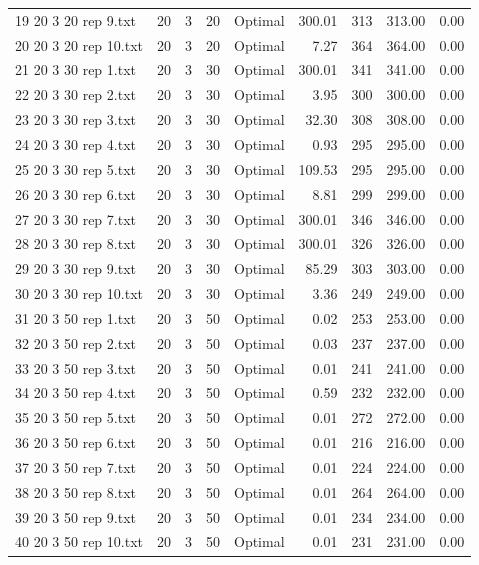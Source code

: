 \begin{longtable}{lrrllrrrr}
19 20 3 20 rep 9.txt & 20 & 3 & 20 & Optimal & 300.01 & 313 & 313.00 &  0.00\\
20 20 3 20 rep 10.txt & 20 & 3 & 20 & Optimal &  7.27 & 364 & 364.00 &  0.00\\
21 20 3 30 rep 1.txt & 20 & 3 & 30 & Optimal & 300.01 & 341 & 341.00 &  0.00\\
22 20 3 30 rep 2.txt & 20 & 3 & 30 & Optimal &  3.95 & 300 & 300.00 &  0.00\\
23 20 3 30 rep 3.txt & 20 & 3 & 30 & Optimal & 32.30 & 308 & 308.00 &  0.00\\
24 20 3 30 rep 4.txt & 20 & 3 & 30 & Optimal &  0.93 & 295 & 295.00 &  0.00\\
25 20 3 30 rep 5.txt & 20 & 3 & 30 & Optimal & 109.53 & 295 & 295.00 &  0.00\\
26 20 3 30 rep 6.txt & 20 & 3 & 30 & Optimal &  8.81 & 299 & 299.00 &  0.00\\
27 20 3 30 rep 7.txt & 20 & 3 & 30 & Optimal & 300.01 & 346 & 346.00 &  0.00\\
28 20 3 30 rep 8.txt & 20 & 3 & 30 & Optimal & 300.01 & 326 & 326.00 &  0.00\\
29 20 3 30 rep 9.txt & 20 & 3 & 30 & Optimal & 85.29 & 303 & 303.00 &  0.00\\
30 20 3 30 rep 10.txt & 20 & 3 & 30 & Optimal &  3.36 & 249 & 249.00 &  0.00\\
31 20 3 50 rep 1.txt & 20 & 3 & 50 & Optimal &  0.02 & 253 & 253.00 &  0.00\\
32 20 3 50 rep 2.txt & 20 & 3 & 50 & Optimal &  0.03 & 237 & 237.00 &  0.00\\
33 20 3 50 rep 3.txt & 20 & 3 & 50 & Optimal &  0.01 & 241 & 241.00 &  0.00\\
34 20 3 50 rep 4.txt & 20 & 3 & 50 & Optimal &  0.59 & 232 & 232.00 &  0.00\\
35 20 3 50 rep 5.txt & 20 & 3 & 50 & Optimal &  0.01 & 272 & 272.00 &  0.00\\
36 20 3 50 rep 6.txt & 20 & 3 & 50 & Optimal &  0.01 & 216 & 216.00 &  0.00\\
37 20 3 50 rep 7.txt & 20 & 3 & 50 & Optimal &  0.01 & 224 & 224.00 &  0.00\\
38 20 3 50 rep 8.txt & 20 & 3 & 50 & Optimal &  0.01 & 264 & 264.00 &  0.00\\
39 20 3 50 rep 9.txt & 20 & 3 & 50 & Optimal &  0.01 & 234 & 234.00 &  0.00\\
40 20 3 50 rep 10.txt & 20 & 3 & 50 & Optimal &  0.01 & 231 & 231.00 &  0.00\\

\end{longtable}
